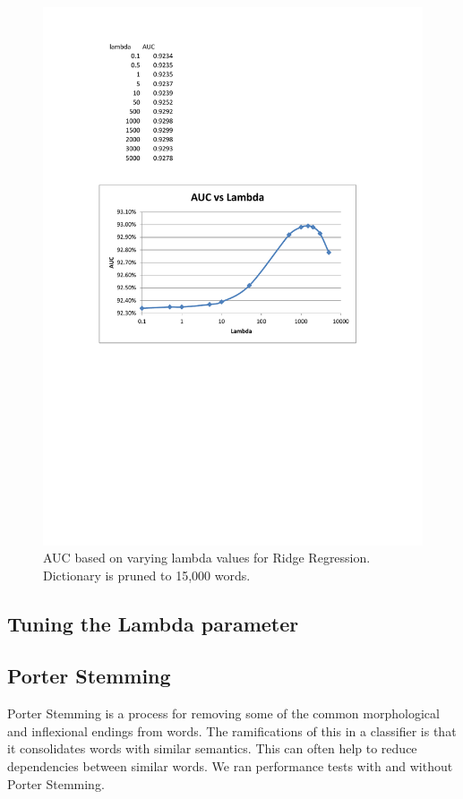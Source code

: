 \documentclass{article}
\begin{document}
\begin{figure}[t]
	\centering
	\includegraphics[width=\linewidth]{files/lambda.pdf}
	\caption{AUC based on varying lambda values for Ridge Regression. Dictionary is pruned to 15,000 words.}
	\label{fig:lambda}
\end{figure}



\subsection{Tuning the Lambda parameter}

\subsection{Porter Stemming}
Porter Stemming is a process for removing some of the common morphological and inflexional endings from words. The ramifications of this in a classifier is that it consolidates words with similar semantics. This can often help to reduce dependencies between similar words. We ran performance tests with and without Porter Stemming. 
\end{document}
